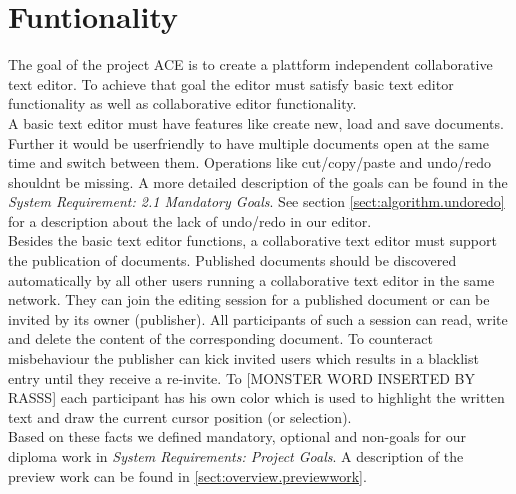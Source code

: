 \chapter{Funtionality}
\label{chapter:functionality}

The goal of the project ACE is to create a plattform independent collaborative text editor. To achieve that goal the editor must satisfy basic text editor functionality as well as collaborative editor functionality.\\

A basic text editor must have features like create new, load and save documents. Further it would be userfriendly to have multiple documents open at the same time and switch between them. Operations like cut/copy/paste and undo/redo shouldnt be missing. A more detailed description of the goals can be found in the \textit{System Requirement: 2.1 Mandatory Goals}. See section \ref{sect:algorithm.undoredo} for a description about the lack of undo/redo in our editor.\\

Besides the basic text editor functions, a collaborative text editor must support the publication of documents. Published documents should be discovered automatically by all other users running a collaborative text editor in the same network. They can join the editing session for a published document or can be invited by its owner (publisher). All participants of such a session can read, write and delete the content of the corresponding document. To counteract misbehaviour the publisher can kick invited users which results in a blacklist entry until they receive a re-invite. To [MONSTER WORD INSERTED BY RASSS] each participant has his own color which is used to highlight the written text and draw the current cursor position (or selection).\\

Based on these facts we defined mandatory, optional and non-goals for our diploma work in \textit{System Requirements: Project Goals}. A description of the preview work can be found in \ref{sect:overview.previewwork}.
